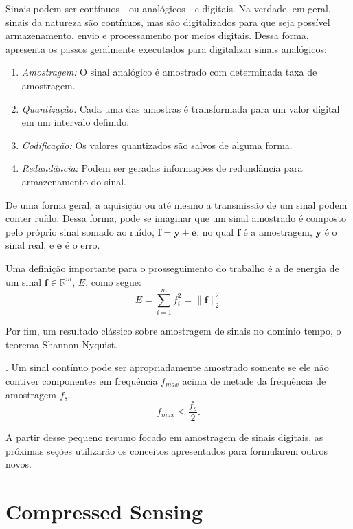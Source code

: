 \documentclass[cic,tc]{iiufrgs}
\renewcommand{\vec}[1]{\bm{#1}}
\begin{document}
Sinais podem ser contínuos - ou analógicos - e digitais.
Na verdade, em geral, sinais da natureza são contínuos, mas são digitalizados 
para que seja possível armazenamento, envio e processamento por meios digitais.
Dessa forma, \citet{haykin2001sinais} apresenta os passos geralmente executados 
para digitalizar sinais analógicos:
\begin{enumerate}
    \item \emph{Amostragem:} O sinal analógico é amostrado com determinada taxa de amostragem.
    \item \emph{Quantização:} Cada uma das amostras é transformada para um valor digital em um intervalo definido.
    \item \emph{Codificação:} Os valores quantizados são salvos de alguma forma.
    \item \emph{Redundância:} Podem ser geradas informações de redundância para armazenamento do sinal.
\end{enumerate} 

De uma forma geral, a aquisição ou até mesmo a transmissão de um sinal podem conter ruído.
Dessa forma, pode se imaginar que um sinal amostrado é composto pelo próprio sinal somado ao ruído,
$\vec{f} = \vec{y} + \vec{e}$, no qual $\vec{f}$ é a amostragem, $\vec{y}$ é o sinal real, 
e $\vec{e}$ é o erro.


Uma definição importante para o prosseguimento do trabalho é a de energia de um sinal $\vec{f} \in \mathbb{R}^m$,
$E$, como segue:
\begin{equation}
    E = \sum_{i=1}^m f_i^2 = \lVert \vec{f} \rVert_2^2
\end{equation}

Por fim, um resultado clássico sobre amostragem de sinais no domínio tempo, o teorema Shannon-Nyquist.
\begin{teorema}
    \cite{NyquistSampling}.
    Um sinal contínuo pode ser apropriadamente amostrado somente se ele não contiver 
    componentes em frequência $f_{max}$ acima de metade da frequência de amostragem $f_s$.
    \begin{equation*}
        f_{max} \le \frac{f_s}{2}.
    \end{equation*}
\end{teorema}

A partir desse pequeno resumo focado em amostragem de sinais digitais,
as próximas seções utilizarão os conceitos apresentados para formularem outros novos.

\section{Compressed Sensing}
\end{document}
